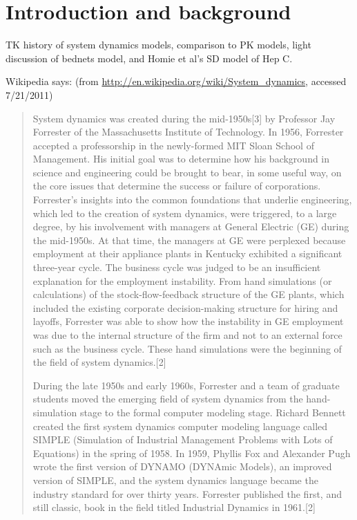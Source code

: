 \label{chapter:system-dynamics}
\section{Introduction and background}

TK history of system dynamics models, comparison to PK models, light
discussion of bednets model, and Homie et al's SD model of Hep C.

Wikipedia says: (from \url{http://en.wikipedia.org/wiki/System_dynamics}, accessed 7/21/2011)
\begin{quote}
System dynamics was created during the mid-1950s[3] by Professor Jay
Forrester of the Massachusetts Institute of Technology. In 1956,
Forrester accepted a professorship in the newly-formed MIT Sloan
School of Management. His initial goal was to determine how his
background in science and engineering could be brought to bear, in
some useful way, on the core issues that determine the success or
failure of corporations. Forrester's insights into the common
foundations that underlie engineering, which led to the creation of
system dynamics, were triggered, to a large degree, by his involvement
with managers at General Electric (GE) during the mid-1950s. At that
time, the managers at GE were perplexed because employment at their
appliance plants in Kentucky exhibited a significant three-year
cycle. The business cycle was judged to be an insufficient explanation
for the employment instability. From hand simulations (or
calculations) of the stock-flow-feedback structure of the GE plants,
which included the existing corporate decision-making structure for
hiring and layoffs, Forrester was able to show how the instability in
GE employment was due to the internal structure of the firm and not to
an external force such as the business cycle. These hand simulations
were the beginning of the field of system dynamics.[2]

During the late 1950s and early 1960s, Forrester and a team of
graduate students moved the emerging field of system dynamics from the
hand-simulation stage to the formal computer modeling stage. Richard
Bennett created the first system dynamics computer modeling language
called SIMPLE (Simulation of Industrial Management Problems with Lots
of Equations) in the spring of 1958. In 1959, Phyllis Fox and
Alexander Pugh wrote the first version of DYNAMO (DYNAmic Models), an
improved version of SIMPLE, and the system dynamics language became
the industry standard for over thirty years. Forrester published the
first, and still classic, book in the field titled Industrial Dynamics
in 1961.[2]


\end{quote}
